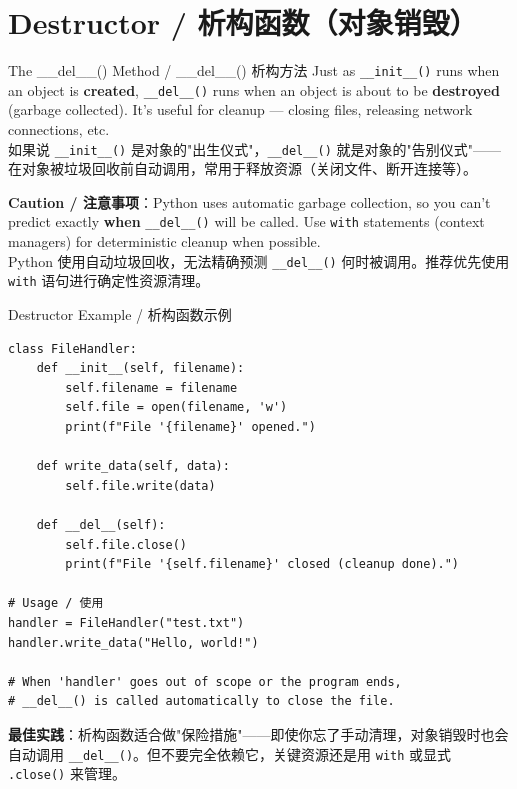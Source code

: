 \documentclass[11pt,a4paper]{report}
\let\oldtexttt\texttt
\renewcommand{\texttt}[1]{\textcolor{mainblue}{\oldtexttt{#1}}}
\begin{document}
\section{Destructor / 析构函数（对象销毁）}

\begin{concept}{The \_\_del\_\_() Method / \_\_del\_\_() 析构方法}
    Just as \texttt{\_\_init\_\_()} runs when an object is \textbf{created}, \texttt{\_\_del\_\_()} runs when an object is about to be \textbf{destroyed} (garbage collected). It's useful for cleanup — closing files, releasing network connections, etc. \\
    如果说 \texttt{\_\_init\_\_()} 是对象的"出生仪式"，\texttt{\_\_del\_\_()} 就是对象的"告别仪式"——在对象被垃圾回收前自动调用，常用于释放资源（关闭文件、断开连接等）。

    \textbf{Caution / 注意事项}：Python uses automatic garbage collection, so you can't predict exactly \textbf{when} \texttt{\_\_del\_\_()} will be called. Use \texttt{with} statements (context managers) for deterministic cleanup when possible. \\
    Python 使用自动垃圾回收，无法精确预测 \texttt{\_\_del\_\_()} 何时被调用。推荐优先使用 \texttt{with} 语句进行确定性资源清理。
\end{concept}

\begin{examplebox}{Destructor Example / 析构函数示例}
\begin{lstlisting}
class FileHandler:
    def __init__(self, filename):
        self.filename = filename
        self.file = open(filename, 'w')
        print(f"File '{filename}' opened.")

    def write_data(self, data):
        self.file.write(data)

    def __del__(self):
        self.file.close()
        print(f"File '{self.filename}' closed (cleanup done).")

# Usage / 使用
handler = FileHandler("test.txt")
handler.write_data("Hello, world!")

# When 'handler' goes out of scope or the program ends,
# __del__() is called automatically to close the file.
\end{lstlisting}
    \textbf{最佳实践}：析构函数适合做"保险措施"——即使你忘了手动清理，对象销毁时也会自动调用 \texttt{\_\_del\_\_()}。但不要完全依赖它，关键资源还是用 \texttt{with} 或显式 \texttt{.close()} 来管理。
\end{examplebox}
\end{document}
